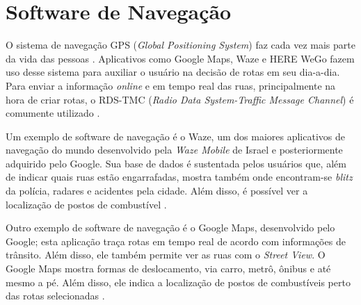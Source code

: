 \section{Software de Navegação}

O sistema de navegação GPS (\textit{Global Positioning System}) faz cada vez mais parte da vida das pessoas \cite{gps-1}. Aplicativos como Google Maps, Waze e HERE WeGo fazem uso desse sistema para auxiliar o usuário na decisão de rotas em seu dia-a-dia. Para enviar a informação \textit{online} e em tempo real das ruas, principalmente na hora de criar rotas, o RDS-TMC (\textit{Radio Data System-Traffic Message Channel}) é comumente utilizado \cite{rds-tmc}.

Um exemplo de software de navegação é o Waze, um dos maiores aplicativos de navegação do mundo desenvolvido pela \textit{Waze Mobile} de Israel e posteriormente adquirido pelo Google. Sua base de dados é sustentada pelos usuários que, além de indicar quais ruas estão engarrafadas, mostra também onde encontram-se \textit{blitz} da polícia, radares e acidentes pela cidade. Além disso, é possível ver a localização de postos de combustível \cite{waze}.

Outro exemplo de software de navegação é o Google Maps, desenvolvido pelo Google; esta aplicação traça rotas em tempo real de acordo com informações de trânsito. Além disso, ele também permite ver as ruas com o \textit{Street View}. O Google Maps mostra formas de deslocamento, via carro, metrô, ônibus e até mesmo a pé. Além disso, ele indica a localização de postos de combustíveis perto das rotas selecionadas \cite{google-maps}.
